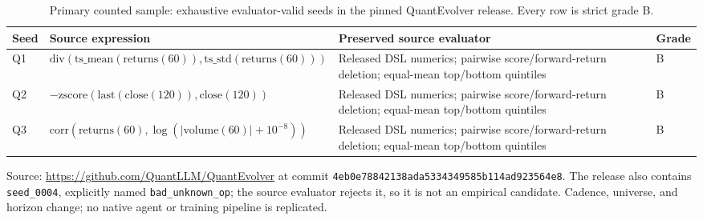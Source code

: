\begin{table}[t]
  \caption{Primary counted sample: exhaustive evaluator-valid seeds in the pinned QuantEvolver release. Every row is strict grade B.}
  \label{tab:faithful-components}
  \centering
  \scriptsize
  \setlength{\tabcolsep}{4pt}
  \begin{tabularx}{\textwidth}{@{}l l X l@{}}
    \toprule
    Seed & Source expression & Preserved source evaluator & Grade \\
    \midrule
    Q1 & $\mathrm{div}(\mathrm{ts\_mean}(\mathrm{returns}(60)),\mathrm{ts\_std}(\mathrm{returns}(60)))$ & Released DSL numerics; pairwise score/forward-return deletion; equal-mean top/bottom quintiles & B \\
    Q2 & $-\mathrm{zscore}(\mathrm{last}(\mathrm{close}(120)),\mathrm{close}(120))$ & Released DSL numerics; pairwise score/forward-return deletion; equal-mean top/bottom quintiles & B \\
    Q3 & $\mathrm{corr}(\mathrm{returns}(60),\log(|\mathrm{volume}(60)|+10^{-8}))$ & Released DSL numerics; pairwise score/forward-return deletion; equal-mean top/bottom quintiles & B \\
    \bottomrule
  \end{tabularx}
  \vspace{2pt}
  \parbox{0.98\textwidth}{\footnotesize Source: \url{https://github.com/QuantLLM/QuantEvolver} at commit \texttt{4eb0e78842138ada5334349585b114ad923564e8}. The release also contains \texttt{seed\_0004}, explicitly named \texttt{bad\_unknown\_op}; the source evaluator rejects it, so it is not an empirical candidate. Cadence, universe, and horizon change; no native agent or training pipeline is replicated.}
\end{table}
